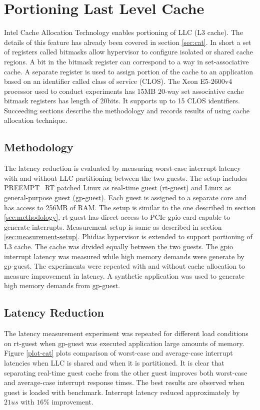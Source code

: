 \section{Portioning Last Level Cache}
Intel Cache Allocation Technology enables portioning of LLC (L3 cache).
The details of this feature has already been covered in section \ref{sec:cat}.
In short a set of registers called bitmasks allow hypervisor to configure isolated or shared cache regions.
A bit in the bitmask register can correspond to a way in set-associative cache.
A separate register is used to assign portion of the cache to an application based on an identifier called class of service (CLOS).
The Xeon E5-2600v4 processor used to conduct experiments has 15MB 20-way set associative cache bitmask registers has length of 20bits. 
It supports up to 15 CLOS identifiers.
Succeeding sections describe the methodology and records results of using cache allocation technique.


\subsection{Methodology}
The latency reduction is evaluated by measuring worst-case interrupt latency with and without LLC partitioning between the two guests.
The setup includes PREEMPT\_RT patched Linux as real-time guest (rt-guest)
and Linux as general-purpose guest (gp-guest). 
Each guest is assigned to a separate core and has access to 256MB of RAM.
The setup is similar to the one described in section \ref{sec:methodology}, rt-guest has direct access to PCIe gpio card capable to generate interrupts. 
Measurement setup is same as described in section \ref{sec:measurement-setup}.
Phidias hypervisor is extended to support portioning of L3 cache. 
The cache was divided equally between the two guests.
The gpio interrupt latency was measured while high memory demands were generate by gp-guest. 
The experiments were repeated with and without cache allocation to measure improvement in latency.
A synthetic application was used to generate high memory demands from gp-guest.

\subsection{Latency Reduction}

The latency measurement experiment was repeated for different load conditions on rt-guest when gp-guest was executed application large amounts of memory. 
Figure \ref{plot-cat} plots comparison of worst-case and average-case interrupt latencies when LLC is shared and when it is partitioned. 
It is clear that separating real-time guest cache from the other guest improves both worst-case and average-case interrupt response times.
The best results are observed when guest is loaded with \mforkops{} benchmark. 
Interrupt latency reduced approximately by $21us$ with $16\%$ improvement.

